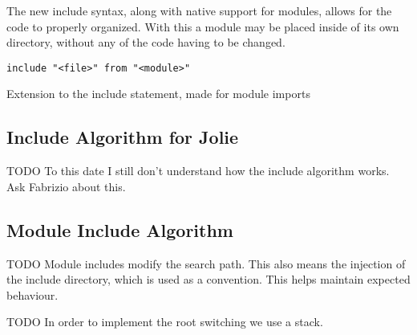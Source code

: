 The new include syntax, along with native support for modules, allows for the
code to properly organized. With this a module may be placed inside of its own
directory, without any of the code having to be changed.

\begin{listing}[H]
\begin{verbatim}
include "<file>" from "<module>"
\end{verbatim}
\caption{Extension to the include statement, made for module imports}
\label{lst:mod_include}
\end{listing}

\subsection{Include Algorithm for Jolie}

TODO To this date I still don't understand how the include algorithm works. Ask
Fabrizio about this.

\subsection{Module Include Algorithm}

TODO Module includes modify the search path. This also means the injection of
the include directory, which is used as a convention. This helps maintain
expected behaviour.

TODO In order to implement the root switching we use a stack.
